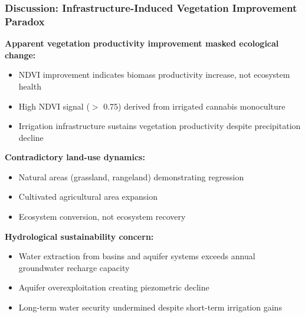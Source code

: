 \documentclass{beamer}
\begin{document}
\begin{frame}
\frametitle{Discussion: Infrastructure-Induced Vegetation Improvement Paradox}

\textbf{Apparent vegetation productivity improvement masked ecological change:}
\begin{itemize}
  \item NDVI improvement indicates biomass productivity increase, not ecosystem health
  \item High NDVI signal ($>$ 0.75) derived from irrigated cannabis monoculture
  \item Irrigation infrastructure sustains vegetation productivity despite precipitation decline
\end{itemize}

\vspace{0.3cm}

\textbf{Contradictory land-use dynamics:}
\begin{itemize}
  \item Natural areas (grassland, rangeland) demonstrating regression
  \item Cultivated agricultural area expansion
  \item Ecosystem conversion, not ecosystem recovery
\end{itemize}

\vspace{0.3cm}

\textbf{Hydrological sustainability concern:}
\begin{itemize}
  \item Water extraction from basins and aquifer systems exceeds annual groundwater recharge capacity
  \item Aquifer overexploitation creating piezometric decline
  \item Long-term water security undermined despite short-term irrigation gains
\end{itemize}

\end{frame}
\end{document}
